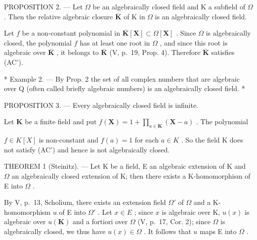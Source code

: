PROPOSITION 2. --- Let \(\Omega\) be an algebraically closed field and K a subfield of \(\Omega\) . Then the relative algebraic closure \(\bar{\mathbf{K}}\) of K in \(\Omega\) is an algebraically closed field.

Let \(f\) be a non-constant polynomial in \(\bar{\mathbf{K}}[\mathbf{X}] \subset \Omega[\mathbf{X}]\) . Since \(\Omega\) is algebraically closed, the polynomial \(f\) has at least one root in \(\Omega\) , and since this root is algebraic over \(\bar{\mathbf{K}}\) , it belongs to \(\bar{\mathbf{K}}\) (V, p.~19, Prop. 4). Therefore \(\bar{\mathbf{K}}\) satisfies (AC').

* Example 2. --- By Prop. 2 the set of all complex numbers that are algebraic over Q (often called briefly algebraic numbers) is an algebraically closed field. *

PROPOSITION 3. --- Every algebraically closed field is infinite.

Let \(\mathbf{K}\) be a finite field and put \(f(\mathbf{X}) = 1 + \prod_{a\in \mathbf{K}}(\mathbf{X} - a)\) . The polynomial

\(f \in K[X]\) is non-constant and \(f(a) = 1\) for each \(a \in K\) . So the field K does not satisfy (AC') and hence is not algebraically closed.

THEOREM 1 (Steinitz). --- Let K be a field, E an algebraic extension of K and \(\Omega\) an algebraically closed extension of K; then there exists a K-homomorphism of E into \(\Omega\) .

By V, p.~13, Scholium, there exists an extension field \(\Omega'\) of \(\Omega\) and a K-homomorphism \(u\) of E into \(\Omega'\) . Let \(x \in E\) ; since \(x\) is algebraic over K, \(u(x)\) is algebraic over \(u(\mathbf{K})\) and a fortiori over \(\Omega\) (V, p.~17, Cor. 2); since \(\Omega\) is algebraically closed, we thus have \(u(x) \in \Omega\) . It follows that \(u\) maps E into \(\Omega\) .

